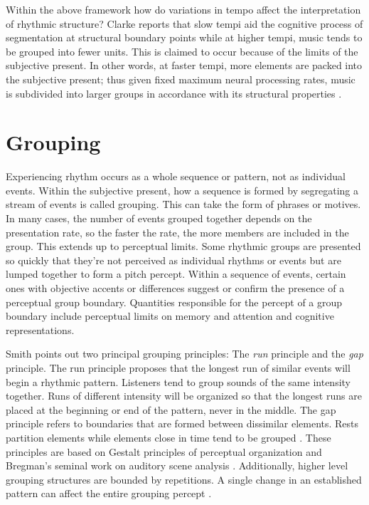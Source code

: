Within the above framework how do variations in tempo affect the
interpretation of rhythmic structure?  Clarke reports that slow tempi
aid the cognitive process of segmentation at structural boundary
points while at higher tempi, music tends to be grouped into fewer
units. This is claimed to occur because of the limits of the subjective
present. In other words, at faster tempi, more elements are packed into
the subjective present; thus given fixed maximum neural processing
rates, music is subdivided into larger groups in accordance with 
its structural properties \cite[p. 36]{Smith:99}.

\vspace{7mm}
\section{Grouping}
\vspace{3mm}

Experiencing rhythm occurs as a whole sequence or pattern, not as
individual events. Within the subjective present, how a sequence 
is formed by segregating a stream of events is called grouping. This
can take the form of phrases or motives. In many cases, the number of 
events grouped together depends on the presentation
rate, so the faster the rate, the more members are included in the
group. This extends up to perceptual limits.  Some rhythmic 
groups are presented so quickly that they're not perceived as
individual rhythms or events but are lumped together to form a pitch percept. 
Within a sequence of events, certain ones with objective accents or 
differences suggest or confirm the presence of a perceptual group
boundary.  Quantities responsible for the percept of a group 
boundary include perceptual limits on memory and attention and 
cognitive representations.

Smith points out two principal grouping principles: The {\it run} 
principle and the {\it gap} principle.  The run principle proposes that 
the longest run of similar events will begin a rhythmic pattern. 
Listeners tend to group sounds of the same intensity together. Runs of 
different intensity will be organized so that the longest runs are
placed at the beginning or end of the pattern, never in the middle. 
The gap principle refers to boundaries that are formed between 
dissimilar elements. Rests partition elements while elements close 
in time tend to be grouped \cite[p. 28]{Smith:99}. These principles
are based on Gestalt principles of perceptual organization and
Bregman's seminal work on auditory scene analysis
\cite{Bregman:90}. Additionally, higher level grouping structures are 
bounded by repetitions. A single change in an established pattern 
can affect the entire grouping percept \cite[p. 28]{Smith:99}.

